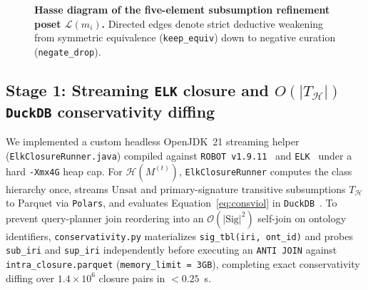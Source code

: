 \documentclass[10pt]{article}
\theoremstyle{accentdef}
\begin{document}
\begin{figure}[t]
\centering
{}
\caption{\textbf{Hasse diagram of the five-element subsumption refinement poset $\mathcal{L}(m_i)$.} Directed edges denote strict deductive weakening from symmetric equivalence (\texttt{keep\_equiv}) down to negative curation (\texttt{negate\_drop}).}
\label{fig:poset}
\end{figure}

\subsection*{Stage 1: Streaming \texttt{ELK} closure and $O(|T_{\mathcal{H}}|)$ \texttt{DuckDB} conservativity diffing}

We implemented a custom headless OpenJDK~21 streaming helper (\texttt{ElkClosureRunner.java}) compiled against \texttt{ROBOT~v1.9.11}~\cite{jackson2019robot} and \texttt{ELK}~\cite{kazakov2014elk} under a hard \texttt{-Xmx4G} heap cap. For $\mathcal{H}(M^{(t)})$, \texttt{ElkClosureRunner} computes the class hierarchy once, streams $\mathrm{Unsat}$ and primary-signature transitive subsumptions $T_{\mathcal{H}}$ to Parquet via \texttt{Polars}, and evaluates Equation~\eqref{eq:consviol} in \texttt{DuckDB}~\cite{raasveldt2019duckdb}. To prevent query-planner join reordering into an $\mathcal{O}(|\mathrm{Sig}|^2)$ self-join on ontology identifiers, \texttt{conservativity.py} materializes \texttt{sig\_tbl(iri, ont\_id)} and probes \texttt{sub\_iri} and \texttt{sup\_iri} independently before executing an \texttt{ANTI JOIN} against \texttt{intra\_closure.parquet} (\texttt{memory\_limit = 3GB}), completing exact conservativity diffing over $1.4 \times 10^6$ closure pairs in $< 0.25$~s.
\end{document}
